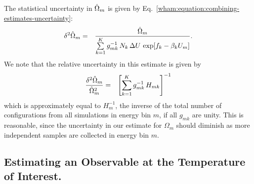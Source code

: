 The statistical uncertainty in $\hat{\Omega}_m$ is given by Eq.\ \ref{wham:equation:combining-estimates-uncertainty}:
\begin{eqnarray}
\delta^2 \hat{\Omega}_m &=& \frac{\hat{\Omega}_m}{\sum\limits_{k=1}^K g_{mk}^{-1} \, N_k \, \Delta U \, \exp[f_k - \beta_k U_m]} .
\end{eqnarray}
We note that the relative uncertainty in this estimate is given by
\begin{eqnarray}
\frac{\delta^2 \hat{\Omega}_m}{\hat{\Omega}_m^2} &=& \left[ \sum_{k=1}^K g_{mk}^{-1} \, H_{mk} \right]^{-1}
\end{eqnarray}
which is approximately equal to $H_m^{-1}$, the inverse of the total number of configurations from all simulations in energy bin $m$, if all $g_{mk}$ are unity.  This is reasonable, since the uncertainty in our estimate for $\Omega_m$ should diminish as more independent samples are collected in energy bin $m$.

\subsection{Estimating an Observable at the Temperature of Interest.}
\label{wham:section:expectation}

